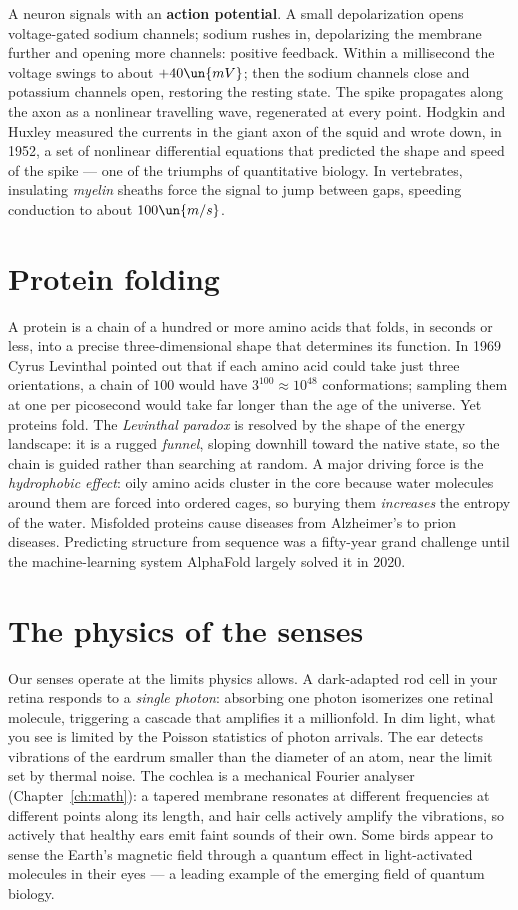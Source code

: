 A neuron signals with an \textbf{action potential}. A small depolarization opens voltage-gated sodium channels; sodium rushes in, depolarizing the membrane further and opening more channels: positive feedback. Within a millisecond the voltage swings to about $+40\un{mV}$; then the sodium channels close and potassium channels open, restoring the resting state. The spike propagates along the axon as a nonlinear travelling wave, regenerated at every point. Hodgkin and Huxley measured the currents in the giant axon of the squid and wrote down, in 1952, a set of nonlinear differential equations that predicted the shape and speed of the spike --- one of the triumphs of quantitative biology. In vertebrates, insulating \emph{myelin} sheaths force the signal to jump between gaps, speeding conduction to about $100\un{m/s}$.

\section{Protein folding}

A protein is a chain of a hundred or more amino acids that folds, in seconds or less, into a precise three-dimensional shape that determines its function. In 1969 Cyrus Levinthal pointed out that if each amino acid could take just three orientations, a chain of $100$ would have $3^{100}\approx10^{48}$ conformations; sampling them at one per picosecond would take far longer than the age of the universe. Yet proteins fold. The \emph{Levinthal paradox} is resolved by the shape of the energy landscape: it is a rugged \emph{funnel}, sloping downhill toward the native state, so the chain is guided rather than searching at random. A major driving force is the \emph{hydrophobic effect}: oily amino acids cluster in the core because water molecules around them are forced into ordered cages, so burying them \emph{increases} the entropy of the water. Misfolded proteins cause diseases from Alzheimer's to prion diseases. Predicting structure from sequence was a fifty-year grand challenge until the machine-learning system AlphaFold largely solved it in 2020.

\section{The physics of the senses}

Our senses operate at the limits physics allows. A dark-adapted rod cell in your retina responds to a \emph{single photon}: absorbing one photon isomerizes one retinal molecule, triggering a cascade that amplifies it a millionfold. In dim light, what you see is limited by the Poisson statistics of photon arrivals. The ear detects vibrations of the eardrum smaller than the diameter of an atom, near the limit set by thermal noise. The cochlea is a mechanical Fourier analyser (Chapter~\ref{ch:math}): a tapered membrane resonates at different frequencies at different points along its length, and hair cells actively amplify the vibrations, so actively that healthy ears emit faint sounds of their own. Some birds appear to sense the Earth's magnetic field through a quantum effect in light-activated molecules in their eyes --- a leading example of the emerging field of quantum biology.

